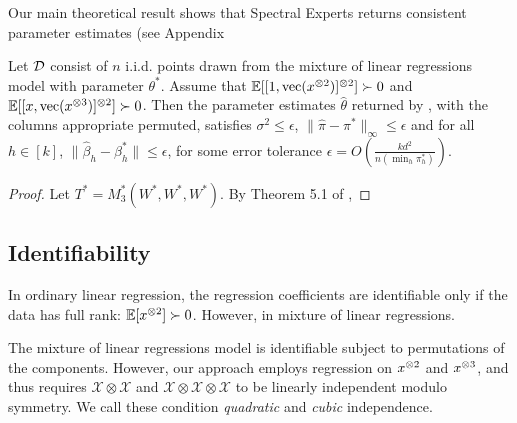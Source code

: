 Our main theoretical result shows that Spectral Experts returns
consistent parameter estimates (see Appendix
\begin{theorem}
Let $\mathcal{D}$ consist of $n$ i.i.d. points drawn from the mixture
of linear regressions model with parameter $\theta^*$.
Assume that $\operatorname{\mathbb{E}}[[1,\operatorname{vec}(x^{\otimes 2})]^{\otimes 2}] \succ 0$ 
and $\operatorname{\mathbb{E}}[[x,\operatorname{vec}(x^{\otimes 3})]^{\otimes 2}] \succ 0$.
Then the parameter estimates $\hat\theta$ returned by
, with the columns appropriate permuted,
satisfies $\sigma^2 \le \epsilon$,
$\|\hat\pi - \pi^*\|_{\infty} \le \epsilon$
and for all $h \in [k]$,
$\|\hat\beta_h - \beta^*_h\| \le \epsilon$,
for some error tolerance $\epsilon = O(\frac{kd^2}{n (\min_h \pi_h^*)})$.
\end{theorem}
\begin{proof}
Let $T^* = M_3^*(W^*, W^*, W^*)$.
By Theorem 5.1 of \cite{AnandkumarGeHsu2012},
\end{proof}



\subsection{Identifiability}

In ordinary linear regression, the regression coefficients are identifiable
only if the data has full rank: $\operatorname{\mathbb{E}}[x^{\otimes 2}] \succ 0$.
However, in mixture of linear regressions.

The mixture of linear regressions model is identifiable subject to
permutations of the components. However, our approach
employs regression on $x^{\otimes 2}$ and $x^{\otimes 3}$, and thus requires
$\mathcal{X} \otimes \mathcal{X}$ and $\mathcal{X} \otimes \mathcal{X}
\otimes \mathcal{X}$ to be linearly independent modulo symmetry. We call
these condition {\em quadratic} and {\em cubic} independence.

